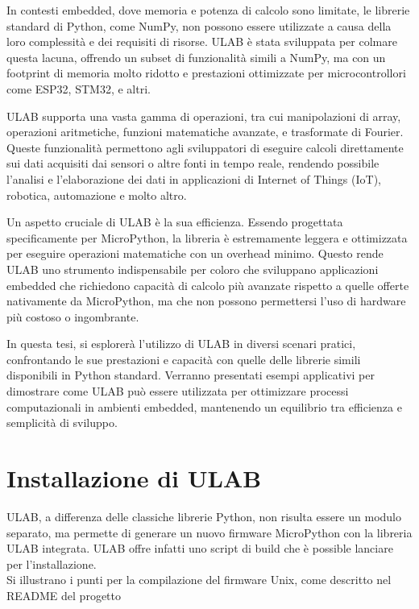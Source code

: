 \documentclass[12pt,a4paper]{report}
\begin{document}
In contesti embedded, dove memoria e potenza di calcolo sono limitate,
le librerie standard di Python, come NumPy, non possono essere
utilizzate a causa della loro complessità e dei requisiti di risorse.
ULAB è stata sviluppata per colmare questa lacuna, offrendo un subset di
funzionalità simili a NumPy, ma con un footprint di memoria molto
ridotto e prestazioni ottimizzate per microcontrollori come ESP32,
STM32, e altri.

ULAB supporta una vasta gamma di operazioni, tra cui manipolazioni di
array, operazioni aritmetiche, funzioni matematiche avanzate, e
trasformate di Fourier. Queste funzionalità permettono agli sviluppatori
di eseguire calcoli direttamente sui dati acquisiti dai sensori o altre
fonti in tempo reale, rendendo possibile l'analisi e
l'elaborazione dei dati in applicazioni di Internet of
Things (IoT), robotica, automazione e molto altro.

Un aspetto cruciale di ULAB è la sua efficienza. Essendo progettata
specificamente per MicroPython, la libreria è estremamente leggera e
ottimizzata per eseguire operazioni matematiche con un overhead minimo.
Questo rende ULAB uno strumento indispensabile per coloro che sviluppano
applicazioni embedded che richiedono capacità di calcolo più avanzate
rispetto a quelle offerte nativamente da MicroPython, ma che non possono
permettersi l'uso di hardware più costoso o ingombrante.

In questa tesi, si esplorerà l'utilizzo di ULAB in
diversi scenari pratici, confrontando le sue prestazioni e capacità con
quelle delle librerie simili disponibili in Python standard. Verranno
presentati esempi applicativi per dimostrare come ULAB può essere
utilizzata per ottimizzare processi computazionali in ambienti embedded,
mantenendo un equilibrio tra efficienza e semplicità di sviluppo.

\section{Installazione di ULAB}\label{installazione-di-ulab}

ULAB, a differenza delle classiche librerie Python, non risulta essere
un modulo separato, ma permette di generare un nuovo firmware
MicroPython con la libreria ULAB integrata. ULAB offre infatti uno
script di build che è possible lanciare per
l'installazione.\\
Si illustrano i punti per la compilazione del firmware Unix, come
descritto nel README del progetto \cite{ulab_compiling}
\end{document}

